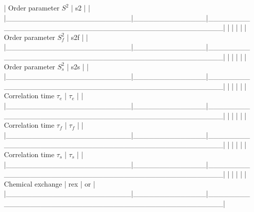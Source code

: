 | Order parameter $S^2$     | s2           | 
                                        |
|\_\_\_\_\_\_\_\_\_\_\_\_\_\_\_\_\_\_\_\_\_\_\_\_|\_\_\_\_\_\_\_\_\_\_\_\_\_\_|\_\_\_\_\_\_\_\_\_\_\_\_\_\_\_\_\_\_\_\_\_\_\_\_\_\_\_\_\_\_\_\_\_\_\_\_\_\_\_\_\_\_\_\_\_\_\_\_\_\_|
|                        |              |                                                  |
| Order parameter $S^2_f$    | s2f          | 
                                       |
|\_\_\_\_\_\_\_\_\_\_\_\_\_\_\_\_\_\_\_\_\_\_\_\_|\_\_\_\_\_\_\_\_\_\_\_\_\_\_|\_\_\_\_\_\_\_\_\_\_\_\_\_\_\_\_\_\_\_\_\_\_\_\_\_\_\_\_\_\_\_\_\_\_\_\_\_\_\_\_\_\_\_\_\_\_\_\_\_\_|
|                        |              |                                                  |
| Order parameter $S^2_s$    | s2s          | 
                                       |
|\_\_\_\_\_\_\_\_\_\_\_\_\_\_\_\_\_\_\_\_\_\_\_\_|\_\_\_\_\_\_\_\_\_\_\_\_\_\_|\_\_\_\_\_\_\_\_\_\_\_\_\_\_\_\_\_\_\_\_\_\_\_\_\_\_\_\_\_\_\_\_\_\_\_\_\_\_\_\_\_\_\_\_\_\_\_\_\_\_|
|                        |              |                                                  |
| Correlation time $\tau_e$    | $\tau_e$           | 
                                           |
|\_\_\_\_\_\_\_\_\_\_\_\_\_\_\_\_\_\_\_\_\_\_\_\_|\_\_\_\_\_\_\_\_\_\_\_\_\_\_|\_\_\_\_\_\_\_\_\_\_\_\_\_\_\_\_\_\_\_\_\_\_\_\_\_\_\_\_\_\_\_\_\_\_\_\_\_\_\_\_\_\_\_\_\_\_\_\_\_\_|
|                        |              |                                                  |
| Correlation time $\tau_f$    | $\tau_f$           | 
                                           |
|\_\_\_\_\_\_\_\_\_\_\_\_\_\_\_\_\_\_\_\_\_\_\_\_|\_\_\_\_\_\_\_\_\_\_\_\_\_\_|\_\_\_\_\_\_\_\_\_\_\_\_\_\_\_\_\_\_\_\_\_\_\_\_\_\_\_\_\_\_\_\_\_\_\_\_\_\_\_\_\_\_\_\_\_\_\_\_\_\_|
|                        |              |                                                  |
| Correlation time $\tau_s$    | $\tau_s$           | 
                                           |
|\_\_\_\_\_\_\_\_\_\_\_\_\_\_\_\_\_\_\_\_\_\_\_\_|\_\_\_\_\_\_\_\_\_\_\_\_\_\_|\_\_\_\_\_\_\_\_\_\_\_\_\_\_\_\_\_\_\_\_\_\_\_\_\_\_\_\_\_\_\_\_\_\_\_\_\_\_\_\_\_\_\_\_\_\_\_\_\_\_|
|                        |              |                                                  |
| Chemical exchange      | rex          | 
 or 
       |
|\_\_\_\_\_\_\_\_\_\_\_\_\_\_\_\_\_\_\_\_\_\_\_\_|\_\_\_\_\_\_\_\_\_\_\_\_\_\_|\_\_\_\_\_\_\_\_\_\_\_\_\_\_\_\_\_\_\_\_\_\_\_\_\_\_\_\_\_\_\_\_\_\_\_\_\_\_\_\_\_\_\_\_\_\_\_\_\_\_|
